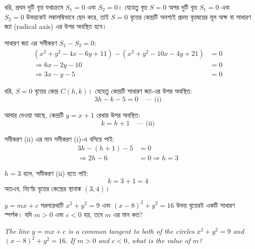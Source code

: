 \documentclass[12pt, a4paper]{article}
\begin{document}
\begin{tcolorbox}[solutionbox={সমাধান (Solution)}]
    \noindent
    ধরি, প্রথম দুটি বৃত্ত যথাক্রমে $S_1 = 0$ এবং $S_2 = 0$। 
    যেহেতু বৃত্ত $S = 0$ অপর দুটি বৃত্ত $S_1 = 0$ এবং $S_2 = 0$ উভয়কেই লম্বালম্বিভাবে ছেদ করে, তাই $S = 0$ বৃত্তের কেন্দ্রটি অবশ্যই প্রদত্ত বৃত্তদ্বয়ের মূল অক্ষ বা সাধারণ জ্যা (radical axis) এর উপর অবস্থিত হবে। 
    
    সাধারণ জ্যা এর সমীকরণ $S_1 - S_2 = 0$:
    \begin{align*}
        (x^2 + y^2 - 4x - 6y + 11) - (x^2 + y^2 - 10x - 4y + 21) &= 0 \\
        \Rightarrow 6x - 2y - 10 &= 0 \\
        \Rightarrow 3x - y - 5 &= 0
    \end{align*}
    
    ধরি, $S = 0$ বৃত্তের কেন্দ্র $C(h, k)$। 
    যেহেতু কেন্দ্রটি সাধারণ জ্যা-এর উপর অবস্থিত:
    \[ 3h - k - 5 = 0 \quad \text{--- (i)} \]
    
    আবার দেওয়া আছে, কেন্দ্রটি $y = x + 1$ রেখার উপর অবস্থিত:
    \[ k = h + 1 \quad \text{--- (ii)} \]
    
    সমীকরণ (ii) এর মান সমীকরণ (i)-এ বসিয়ে পাই:
    \begin{align*}
        3h - (h + 1) - 5 &= 0 \\
        \Rightarrow 2h - 6 &= 0 \Rightarrow h = 3
    \end{align*}
    
    $h = 3$ হলে, সমীকরণ (ii) হতে পাই:
    \[ k = 3 + 1 = 4 \]
    অতএব, নির্ণেয় বৃত্তের কেন্দ্রের স্থানাঙ্ক \textbf{$(3, 4)$}।
\end{tcolorbox}

\vspace{2em}

\begin{tcolorbox}[questionbox={প্রশ্ন (Question) 14}]
    \noindent
    $y = mx + c$ সরলরেখাটি $x^2 + y^2 = 9$ এবং $(x - 8)^2 + y^2 = 16$ উভয় বৃত্তেরই একটি সাধারণ স্পর্শক। যদি $m > 0$ এবং $c < 0$ হয়, তবে $m$ এর মান কত?
    
    \vspace{0.8em}
    \begin{english}
    \noindent\textit{\color{darkgray}
    The line $y = mx + c$ is a common tangent to both of the circles $x^2 + y^2 = 9$ and $(x - 8)^2 + y^2 = 16$. If $m > 0$ and $c < 0$, what is the value of $m$?
    }
    \end{english}
\end{tcolorbox}
\end{document}
